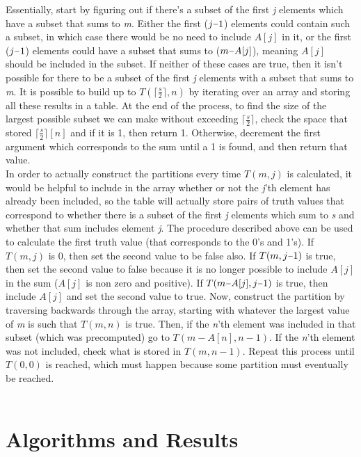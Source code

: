 \documentclass[11pt]{article}
\newcommand\ceil[1]{\lceil#1\rceil}
\newcommand{\minus}{\scalebox{0.75}[1.0]{$-$}}
\begin{document}
Essentially, start by figuring out if there’s a subset of the first \textit{j} elements which have a subset that sums to \textit{m}. Either the first ($j \minus 1$) elements could contain such a subset, in which case there would be no need to include $A[j]$ in it, or the first ($j \minus 1$) elements could have a subset that sums to ($m \minus A[j]$), meaning $A[j]$ should be included in the subset. If neither of these cases are true, then it isn’t possible for there to be a subset of the first \textit{j} elements with a subset that sums to \textit{m}. It is possible to build up to $T(\ceil{\frac{s}{2}}, n)$ by iterating over an array and storing all these results in a table. At the end of the process, to find the size of the largest possible subset we can make without exceeding $\ceil{\frac{s}{2}}$, check the space that stored $\ceil{\frac{s}{2}}[n]$ and if it is 1, then return 1. Otherwise, decrement the first argument which corresponds to the sum until a 1 is found, and then return that value. \\

In order to actually construct the partitions every time $T(m, j)$ is calculated, it would be helpful to include in the array whether or not the \textit{j}'th element has already been included, so the table will actually store pairs of truth values that correspond to whether there is a subset of the first \textit{j} elements which
sum to \textit{s} and whether that sum includes element \textit{j}. The procedure described above can be used to calculate the first truth value (that corresponds to the 0’s and 1’s). If $T(m, j)$ is 0, then set the second value to be false also. If $T(m, j \minus 1)$ is true, then set the second value to false because it is no longer possible to include $A[j]$ in the sum ($A[j]$ is non zero and positive).  If $T(m \minus A[j], j \minus 1)$ is true, then include $A[j]$ and set the second value to true. Now, construct the partition by traversing backwards through the array, starting with whatever the largest value of \textit{m} is such that $T(m, n)$ is true. Then, if the \textit{n}'th element was included in that subset (which was precomputed) go to $T(m - A[n], n - 1)$. If the  \textit{n}'th element was not included, check what is stored in $T(m, n - 1)$. Repeat this process until $T(0, 0)$ is reached, which must happen because some partition must eventually be reached. \\\\


\section{\textbf{Algorithms and Results}}
\end{document}
